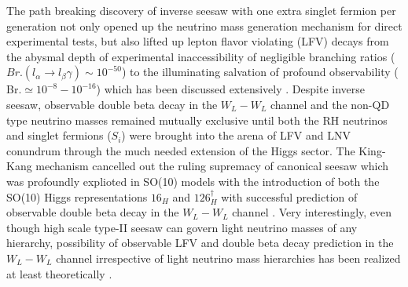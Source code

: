 \documentclass[a4paper,11pt]{article}
\begin{document}
The path breaking discovery of  inverse seesaw \cite{inv1,inv2,inv3,inv4,inv5,inv6,inv7} with
one extra singlet fermion per generation not only opened up
the neutrino mass generation mechanism for direct experimental tests,
but also  lifted up 
lepton flavor violating (LFV) decays \cite{Valle:LFV1987} from the abysmal depth of
experimental inaccessibility of negligible branching ratios (
$ Br.(l_\alpha\to l_\beta \gamma) \sim 10^{-50}$) to the illuminating
salvation of profound observability ( Br.$\simeq
10^{-8}-10^{-16}$) \cite{lfvexpt} which has been discussed extensively \cite{ilakovac,antbnd,non-unit}.  Despite inverse seesaw,
 observable double beta decay in the $W_L-W_L$ channel and the non-QD type
 neutrino masses remained mutually
exclusive until both the RH neutrinos and singlet fermions ($S_i$) were
brought into the arena of LFV and LNV
conundrum through the much needed extension of the Higgs sector. The King-Kang
\cite{Kim-Kang:2006} mechanism cancelled out the ruling supremacy of canonical  
seesaw which was profoundly explioted in SO(10) models with the
introduction of both the SO(10) Higgs representations ${16}_H$ and ${126}^{\dagger}_H$ 
\cite{nurev:mkpbpn,mkp-bs:2015,app:2013,Majee:2009,mkp-ARC:2010,pas:2014,bpn-mkp:2015} with successful
prediction of  observable double beta decay in the
$W_L-W_L$ channel \cite{Valle:t2,Valle:bb1}. Very interestingly, even though high scale type-II seesaw
 can 
govern light neutrino masses of any hierarchy, possibility of observable LFV and double beta
decay prediction in the $W_L-W_L$ channel irrespective of light
neutrino mass hierarchies has been  realized at least
theoretically \cite{nurev:mkpbpn,bpn-mkp:2015}.
\end{document}
